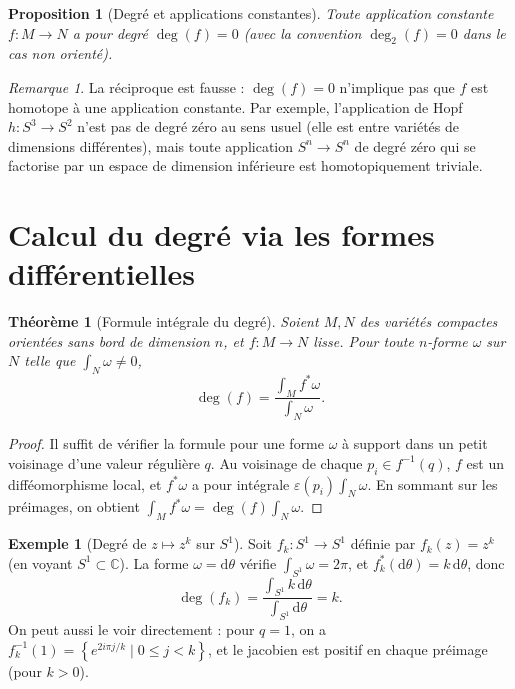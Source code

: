 \documentclass[12pt,a4paper,openany]{book}
\theoremstyle{definition}
\newtheorem{exemple}[definition]{Exemple}
\theoremstyle{plain}
\newtheorem{theoreme}[definition]{Théorème}
\newtheorem{proposition}[definition]{Proposition}
\theoremstyle{remark}
\newtheorem{remarque}[definition]{Remarque}
\newcommand{\C}{\mathbb{C}}
\newcommand{\dd}{\mathrm{d}}
\newcommand{\set}[1]{\left\{#1\right\}}
\begin{document}
\begin{proposition}[Degré et applications constantes]\label{prop:degre-constante}
Toute application constante $f : M \to N$ a pour degré $\deg(f) = 0$ (avec la
convention $\deg_2(f) = 0$ dans le cas non orienté).
\end{proposition}

\begin{remarque}
La réciproque est fausse : $\deg(f) = 0$ n'implique pas que $f$ est homotope à
une application constante. Par exemple, l'application de Hopf
$h : S^3 \to S^2$ n'est pas de degré zéro au sens usuel (elle est entre variétés
de dimensions différentes), mais toute application $S^n \to S^n$ de degré zéro
qui se factorise par un espace de dimension inférieure est homotopiquement
triviale.
\end{remarque}

\section{Calcul du degré via les formes différentielles}\label{sec:degre-formes}

\begin{theoreme}[Formule intégrale du degré]\label{thm:degre-integral}
Soient $M, N$ des variétés compactes orientées sans bord de dimension $n$, et
$f : M \to N$ lisse. Pour toute $n$-forme $\omega$ sur $N$ telle que
$\int_N \omega \neq 0$,
\[
  \deg(f) = \frac{\int_M f^*\omega}{\int_N \omega}.
\]
\end{theoreme}

\begin{proof}
Il suffit de vérifier la formule pour une forme $\omega$ à support dans un petit
voisinage d'une valeur régulière $q$. Au voisinage de chaque $p_i \in f^{-1}(q)$,
$f$ est un difféomorphisme local, et $f^*\omega$ a pour intégrale
$\varepsilon(p_i) \int_N \omega$. En sommant sur les préimages, on obtient
$\int_M f^*\omega = \deg(f) \int_N \omega$.
\end{proof}

\begin{exemple}[Degré de $z \mapsto z^k$ sur $S^1$]\label{ex:degre-cercle}
Soit $f_k : S^1 \to S^1$ définie par $f_k(z) = z^k$ (en voyant $S^1 \subset \C$).
La forme $\omega = \dd\theta$ vérifie $\int_{S^1} \omega = 2\pi$, et
$f_k^*(\dd\theta) = k \, \dd\theta$, donc
\[
  \deg(f_k) = \frac{\int_{S^1} k \, \dd\theta}{\int_{S^1} \dd\theta} = k.
\]
On peut aussi le voir directement : pour $q = 1$, on a
$f_k^{-1}(1) = \set{e^{2i\pi j/k} \mid 0 \leqslant j < k}$, et le jacobien est
positif en chaque préimage (pour $k > 0$).
\end{exemple}
\end{document}
